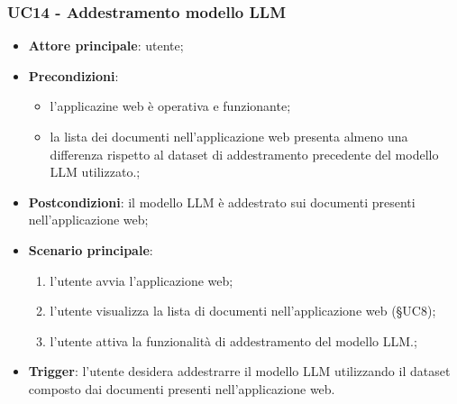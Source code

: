 \documentclass[10pt, a4paper]{article}
\begin{document}
    \subsubsection{UC14 - Addestramento modello LLM}
    \begin{itemize}
        \item \textbf{Attore principale}: utente;
        \item \textbf{Precondizioni}: 
        \begin{itemize}
            \item l'applicazine web è operativa e funzionante;
            \item la lista dei documenti nell'applicazione web presenta almeno una differenza rispetto al dataset di addestramento precedente del modello LLM utilizzato.;
        \end{itemize}
        \item \textbf{Postcondizioni}: il modello LLM è addestrato sui documenti presenti nell'applicazione web;
        \item \textbf{Scenario principale}:
            \begin{enumerate}
                \item l'utente avvia l'applicazione web;
                \item l'utente visualizza la lista di documenti nell'applicazione web (\S UC8);
                \item l'utente attiva la funzionalità di addestramento del modello LLM.; 
            \end{enumerate}
        \item \textbf{Trigger}: l'utente desidera addestrarre il modello LLM utilizzando il dataset composto dai documenti presenti nell'applicazione web.
    \end{itemize}
\end{document}
